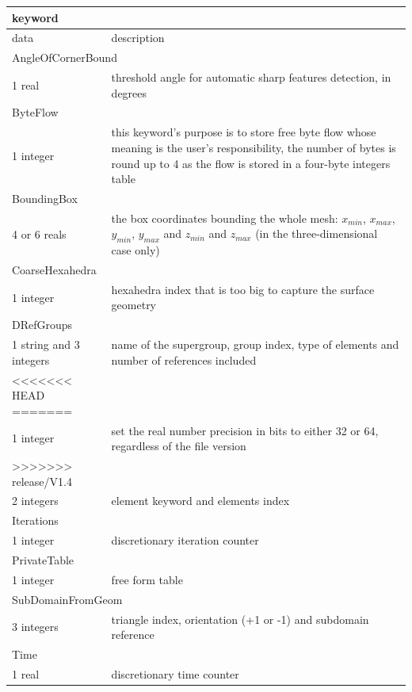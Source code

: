 \documentclass[a4paper,12pt]{article}
\begin{document}
\begin{tabular}{|m{4cm}|m{11cm}|}

\hline
\multicolumn{2}{|l|}{keyword} \\
\hline
data & description \\
\hline\hline

\multicolumn{2}{|l|}{AngleOfCornerBound} \\
\hline
1 real & threshold angle for automatic sharp features detection, in degrees\\
\hline\hline

\multicolumn{2}{|l|}{ByteFlow} \\
\hline
1 integer & this keyword's purpose is to store free byte flow whose meaning is the user's responsibility, the number of bytes is round up to 4 as the flow is stored in a four-byte integers table \\
\hline\hline

\multicolumn{2}{|l|}{BoundingBox} \\
\hline
4 or 6 reals & the box coordinates bounding the whole mesh: $x_{min}$, $x_{max}$, $y_{min}$, $y_{max}$ and $z_{min}$ and $z_{max}$ (in the three-dimensional case only) \\
\hline\hline

\multicolumn{2}{|l|}{CoarseHexahedra} \\
\hline
1 integer & hexahedra index that is too big to capture the surface geometry \\
\hline\hline

\multicolumn{2}{|l|}{DRefGroups} \\
\hline
1 string and 3 integers & name of the supergroup, group index, type of elements and number of references included \\
<<<<<<< HEAD
=======
\hline\hline

\multicolumn{2}{|l|}{FloatingPointPrecision} \\
\hline
1 integer & set the real number precision in bits to either 32 or 64, regardless of the file version \\
>>>>>>> release/V1.4
\hline\hline

\multicolumn{2}{|l|}{IRefGroups} \\
\hline
2 integers & element keyword and elements index \\
\hline\hline

\multicolumn{2}{|l|}{Iterations} \\
\hline
1 integer & discretionary iteration counter \\
\hline\hline

\multicolumn{2}{|l|}{PrivateTable} \\
\hline
1 integer & free form table \\
\hline\hline

\multicolumn{2}{|l|}{SubDomainFromGeom} \\
\hline
3 integers & triangle index, orientation (+1 or -1) and subdomain reference \\
\hline\hline

\multicolumn{2}{|l|}{Time} \\
\hline
1 real & discretionary time counter \\
\hline

\end{tabular}
\end{document}
